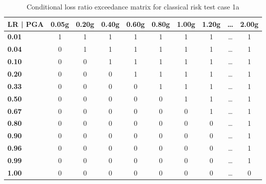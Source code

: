 \begin{table}[htbp]

\centering
\begin{tabular}{ l c c c c c c c c c }

\hline
\rowcolor{anti-flashwhite}
\bf{LR | PGA} & \bf{0.05g} & \bf{0.20g} & \bf{0.40g} & \bf{0.60g} & \bf{0.80g} & \bf{1.00g} & \bf{1.20g} & \bf{\dots} & \bf{2.00g} \\
\hline
\bf{0.01} & 1 & 1 & 1 & 1 & 1 & 1 & 1 & \dots & 1 \\
\bf{0.04} & 0 & 1 & 1 & 1 & 1 & 1 & 1 & \dots & 1 \\
\bf{0.10} & 0 & 0 & 1 & 1 & 1 & 1 & 1 & \dots & 1 \\
\bf{0.20} & 0 & 0 & 0 & 1 & 1 & 1 & 1 & \dots & 1 \\
\bf{0.33} & 0 & 0 & 0 & 0 & 1 & 1 & 1 & \dots & 1 \\
\bf{0.50} & 0 & 0 & 0 & 0 & 0 & 1 & 1 & \dots & 1 \\
\bf{0.67} & 0 & 0 & 0 & 0 & 0 & 0 & 1 & \dots & 1 \\
\bf{0.80} & 0 & 0 & 0 & 0 & 0 & 0 & 0 & \dots & 1 \\
\bf{0.90} & 0 & 0 & 0 & 0 & 0 & 0 & 0 & \dots & 1 \\
\bf{0.96} & 0 & 0 & 0 & 0 & 0 & 0 & 0 & \dots & 1 \\
\bf{0.99} & 0 & 0 & 0 & 0 & 0 & 0 & 0 & \dots & 1 \\
\bf{1.00} & 0 & 0 & 0 & 0 & 0 & 0 & 0 & \dots & 0 \\
\hline
\end{tabular}

\caption{Conditional loss ratio exceedance matrix for classical risk test case 1a}
\label{tab:lrem-ln-tax1-zcov}
\end{table}